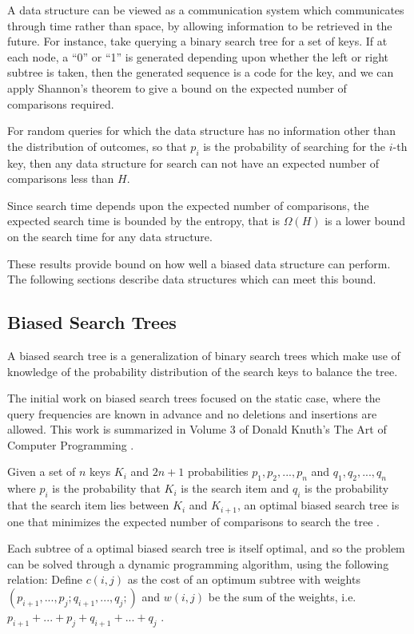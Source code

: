 \documentclass[mcs]{scsthesis}
\begin{document}
A data structure can be viewed as a communication system which communicates
through time rather than space, by allowing information to be retrieved in the
future. For instance, take querying a binary search tree for a set of keys. If
at each node, a ``0'' or ``1'' is generated depending upon whether the left or
right subtree is taken, then the generated sequence is a code for the key, and
we can apply Shannon's theorem to give a bound on the expected number of
comparisons required.

For random queries for which the data structure has no information other than
the distribution of outcomes, so that \(p_i\) is the probability of searching for
the \(i\)-th key, then any data structure for search can not have an expected
number of comparisons less than \(H\).

Since search time depends upon the expected number of comparisons, the expected
search time is bounded by the entropy, that is \(\Omega(H)\) is a lower bound on
the search time for any data structure.

These results provide bound on how well a biased data structure can perform. The
following sections describe data structures which can meet this bound.

\subsection{Biased Search Trees}

A biased search tree is a generalization of binary search trees which make use
of knowledge of the probability distribution of the search keys to balance the
tree.

The initial work on biased search trees focused on the static case, where
the query frequencies are known in advance and no deletions and insertions
are allowed. This work is summarized in Volume 3 of Donald Knuth's The Art of
Computer Programming \cite{knuth}.

Given a set of $n$ keys \(K_i\) and \(2n + 1\) probabilities
\(p_1, p_2, ..., p_n\) and \(q_1, q_2, ..., q_n\) where \(p_i\) is the
probability that \(K_i\) is the search item and \(q_i\) is the
probability that the search item lies between \(K_i\) and \(K_{i+1}\), an
optimal biased search tree is one that minimizes the expected number of
comparisons to search the tree \cite{knuth}.

Each subtree of a optimal biased search tree is itself optimal, and so the
problem can be solved through a dynamic programming algorithm, using the
following relation: Define \( c(i,j)\) as the cost of an optimum subtree with
weights \((p_{i+1}, ..., p_j; q_{i+1}, ..., q_j;)\) and \(w(i, j)\) be the
sum of the weights, i.e. \(p_{i+1} + ... + p_j + q_{i + 1} + ... + q_j \)
\cite{knuth}.
\end{document}
